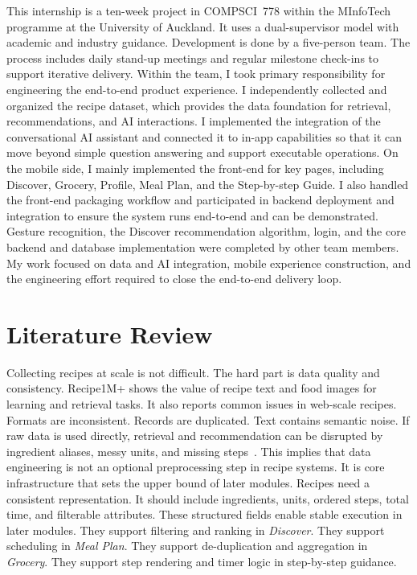 \documentclass[journal]{IEEEtran}
\begin{document}
This internship is a ten-week project in COMPSCI~778 within the MInfoTech programme at the University of Auckland. It uses a dual-supervisor model with academic and industry guidance. Development is done by a five-person team. The process includes daily stand-up meetings and regular milestone check-ins to support iterative delivery. Within the team, I took primary responsibility for engineering the end-to-end product experience. I independently collected and organized the recipe dataset, which provides the data foundation for retrieval, recommendations, and AI interactions. I implemented the integration of the conversational AI assistant and connected it to in-app capabilities so that it can move beyond simple question answering and support executable operations. On the mobile side, I mainly implemented the front-end for key pages, including Discover, Grocery, Profile, Meal Plan, and the Step-by-step Guide. I also handled the front-end packaging workflow and participated in backend deployment and integration to ensure the system runs end-to-end and can be demonstrated. Gesture recognition, the Discover recommendation algorithm, login, and the core backend and database implementation were completed by other team members. My work focused on data and AI integration, mobile experience construction, and the engineering effort required to close the end-to-end delivery loop.

\section{Literature Review}

Collecting recipes at scale is not difficult. The hard part is data quality and consistency. Recipe1M+ shows the value of recipe text and food images for learning and retrieval tasks. It also reports common issues in web-scale recipes. Formats are inconsistent. Records are duplicated. Text contains semantic noise. If raw data is used directly, retrieval and recommendation can be disrupted by ingredient aliases, messy units, and missing steps~\cite{marin2021recipe1mplus}. This implies that data engineering is not an optional preprocessing step in recipe systems. It is core infrastructure that sets the upper bound of later modules. Recipes need a consistent representation. It should include ingredients, units, ordered steps, total time, and filterable attributes. These structured fields enable stable execution in later modules. They support filtering and ranking in \textit{Discover}. They support scheduling in \textit{Meal Plan}. They support de-duplication and aggregation in \textit{Grocery}. They support step rendering and timer logic in step-by-step guidance.
\end{document}

